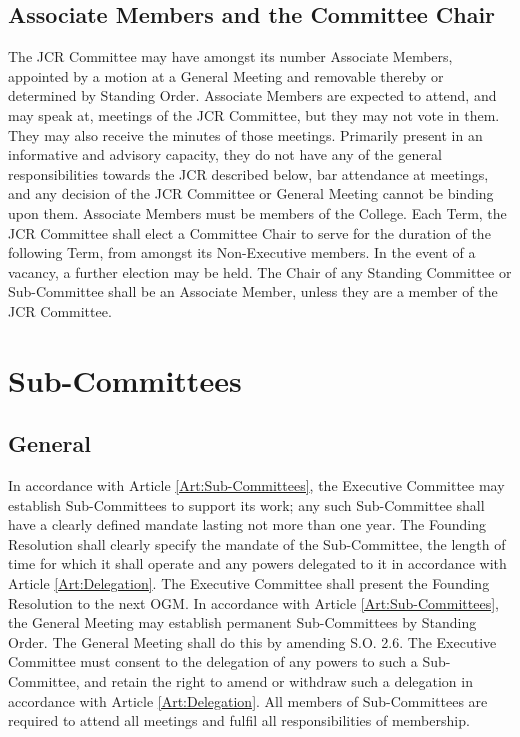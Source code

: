 \subsection{Associate Members and the Committee Chair}
\npara The JCR Committee may have amongst its number Associate Members, appointed by a motion at a General Meeting and removable thereby or determined by Standing Order. Associate Members are expected to attend, and may speak at, meetings of the JCR Committee, but they may not vote in them. They may also receive the minutes of those meetings. Primarily present in an informative and advisory capacity, they do not have any of the general responsibilities towards the JCR described below, bar attendance at meetings, and any decision of the JCR Committee or General Meeting cannot be binding upon them.  Associate Members must be members of the College.
\npara Each Term, the JCR Committee shall elect a Committee Chair to serve for the duration of the following Term, from amongst its Non-Executive members.  In the event of a vacancy, a further election may be held.
\npara The Chair of any Standing Committee or Sub-Committee shall be an Associate Member, unless they are a member of the JCR Committee.
\section{Sub-Committees}
\subsection{General}
\npara In accordance with Article \ref{Art:Sub-Committees}, the Executive Committee may establish Sub-Committees to support its work; any such Sub-Committee shall have a clearly defined mandate lasting not more than one year.  The Founding Resolution shall clearly specify the mandate of the Sub-Committee, the length of time for which it shall operate and any powers delegated to it in accordance with Article \ref{Art:Delegation}.  The Executive Committee shall present the Founding Resolution to the next OGM.
\npara In accordance with Article \ref{Art:Sub-Committees}, the General Meeting may establish permanent Sub-Committees by Standing Order.  The General Meeting shall do this by amending S.O. 2.6.  The Executive Committee must consent to the delegation of any powers to such a Sub-Committee, and retain the right to amend or withdraw such a delegation in accordance with Article \ref{Art:Delegation}.
\npara All members of Sub-Committees are required to attend all meetings and fulfil all responsibilities of membership.
